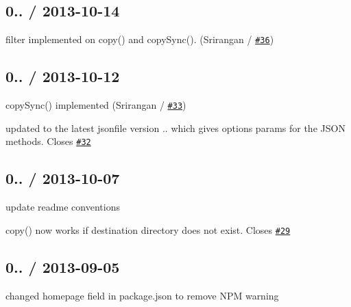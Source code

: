 \subsection*{0.. / 2013-\/10-\/14 }


\begin{DoxyItemize}
\item {\ttfamily filter} implemented on {\ttfamily copy()} and {\ttfamily copy\+Sync()}. (Srirangan / \href{https://github.com/jprichardson/node-fs-extra/pull/36}{\tt \#36})
\end{DoxyItemize}

\subsection*{0.. / 2013-\/10-\/12 }


\begin{DoxyItemize}
\item {\ttfamily copy\+Sync()} implemented (Srirangan / \href{https://github.com/jprichardson/node-fs-extra/pull/33}{\tt \#33})
\item updated to the latest {\ttfamily jsonfile} version {..} which gives {\ttfamily options} params for the J\+S\+ON methods. Closes \href{https://github.com/jprichardson/node-fs-extra/issues/32}{\tt \#32}
\end{DoxyItemize}

\subsection*{0.. / 2013-\/10-\/07 }


\begin{DoxyItemize}
\item update readme conventions
\item {\ttfamily copy()} now works if destination directory does not exist. Closes \href{https://github.com/jprichardson/node-fs-extra/issues/29}{\tt \#29}
\end{DoxyItemize}

\subsection*{0.. / 2013-\/09-\/05 }


\begin{DoxyItemize}
\item changed {\ttfamily homepage} field in package.\+json to remove N\+PM warning
\end{DoxyItemize}

